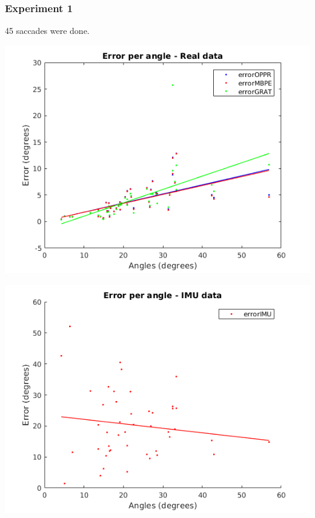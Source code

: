 \subsubsection{Experiment 1}
45 saccades were done.\\
\begin{minipage}{0.5\textwidth}
\centering
\includegraphics[width=\textwidth]{images/sim/r1angle.png}
\label{cha5:sec1:r1angle}
\end{minipage}
\begin{minipage}{0.5\textwidth}
\centering
\includegraphics[width=\textwidth]{images/sim/r1angleimu.png}
\label{cha5:sec1:r1angleimu}
\end{minipage}\\

